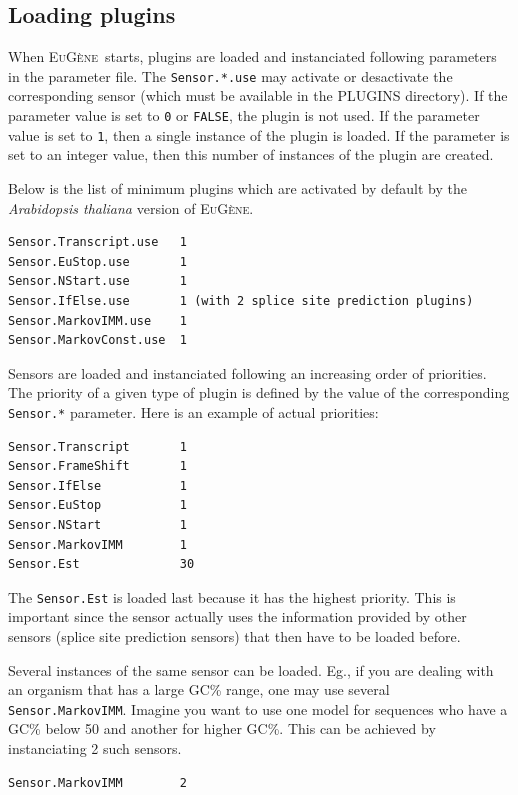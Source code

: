 \documentclass[a4paper,titlepage]{report}
\newcommand{\EuGene}{\textsc{EuG\`ene}}
\begin{document}
\subsection{Loading plugins}

When \EuGene\ starts, plugins are loaded and instanciated following
parameters in the parameter file. The \texttt{Sensor.*.use} may
activate or desactivate the corresponding sensor (which must be
available in the PLUGINS directory). If the parameter value is set to
\texttt{0} or \texttt{FALSE}, the plugin is not used. If the parameter
value is set to \texttt{1}, then a single instance of the plugin is
loaded. If the parameter is set to an integer value, then this number
of instances of the plugin are created.

Below is the list of minimum plugins which are activated by default by
the \emph{Arabidopsis thaliana} version of \EuGene.

\begin{Verbatim}
Sensor.Transcript.use   1
Sensor.EuStop.use       1
Sensor.NStart.use       1
Sensor.IfElse.use       1 (with 2 splice site prediction plugins)
Sensor.MarkovIMM.use    1
Sensor.MarkovConst.use  1
\end{Verbatim}  

Sensors are loaded and instanciated following an increasing order of
priorities. The priority of a given type of plugin is defined by the
value of the corresponding \texttt{Sensor.*} parameter. Here is an
example of actual priorities:

\begin{Verbatim}
Sensor.Transcript       1
Sensor.FrameShift       1
Sensor.IfElse           1
Sensor.EuStop           1       
Sensor.NStart           1       
Sensor.MarkovIMM        1 
Sensor.Est              30         
\end{Verbatim}

The \texttt{Sensor.Est} is loaded last because it has the highest
priority.  This is important since the sensor actually uses the
information provided by other sensors (splice site prediction sensors)
that then have to be loaded before.

Several instances of the same sensor can be loaded. Eg., if you are
dealing with an organism that has a large GC\% range, one may use
several \texttt{Sensor.MarkovIMM}. Imagine you want to use one model
for sequences who have a GC\% below 50 and another for higher GC\%.
This can be achieved by instanciating 2 such sensors. 

\begin{Verbatim}
Sensor.MarkovIMM        2
\end{Verbatim}
\end{document}
